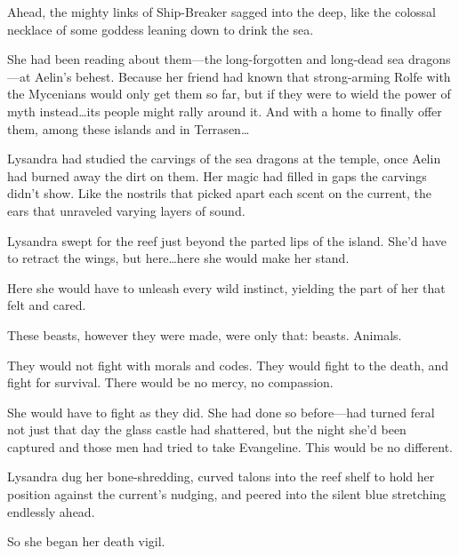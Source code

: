 Ahead, the mighty links of Ship-Breaker sagged into the deep, like the colossal necklace of some goddess leaning down to drink the sea.

She had been reading about them---the long-forgotten and long-dead sea dragons---at Aelin's behest.
Because her friend had known that strong-arming Rolfe with the Mycenians would only get them so far, but if they were to wield the power of myth instead\ldots its people might rally around it.
And with a home to finally offer them, among these islands and in Terrasen\ldots{}

Lysandra had studied the carvings of the sea dragons at the temple, once Aelin had burned away the dirt on them.
Her magic had filled in gaps the carvings didn't show.
Like the nostrils that picked apart each scent on the current, the ears that unraveled varying layers of sound.

Lysandra swept for the reef just beyond the parted lips of the island.
She'd have to retract the wings, but here\ldots here she would make her stand.

Here she would have to unleash every wild instinct, yielding the part of her that felt and cared.

These beasts, however they were made, were only that: beasts.
Animals.

They would not fight with morals and codes.
They would fight to the death, and fight for survival.
There would be no mercy, no compassion.

She would have to fight as they did.
She had done so before---had turned feral not just that day the glass castle had shattered, but the night she'd been captured and those men had tried to take Evangeline.
This would be no different.

Lysandra dug her bone-shredding, curved talons into the reef shelf to hold her position against the current's nudging, and peered into the silent blue stretching endlessly ahead.

So she began her death vigil.
